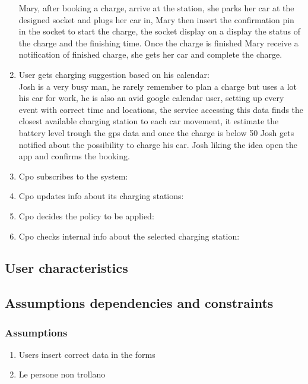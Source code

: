 \begin{enumerate}[label=S\arabic*]
          Mary, after booking a charge, arrive at the station, she parks her car at the designed socket and plugs her car in, Mary then insert the confirmation pin in the socket to start the charge, the socket display on a display the status of the charge and the finishing time.
          Once the charge is finished Mary receive a notification of finished charge, she gets her car and complete the charge.
    \item User gets charging suggestion based on his calendar:\\
          Josh is a very busy man, he rarely remember to plan a charge but uses a lot his car for work, he is also an avid google calendar user, setting up every event with correct time and locations, the service accessing this data finds the closest available charging station to each car movement, it estimate the battery level trough the gps data and once the charge is below 50 Josh gets notified about the possibility to charge his car. Josh liking the idea open the app and confirms the booking.
    \item Cpo subscribes to the system:\\
    \item Cpo updates info about its charging stations:\\
    \item Cpo decides the policy to be applied:\\
    \item Cpo checks internal info about the selected charging station:\\
\end{enumerate}
\subsection{User characteristics}

\subsection{Assumptions dependencies and constraints}
\subsubsection{Assumptions}
\begin{enumerate}[label=A\arabic*]
    \item Users insert correct data in the forms
    \item Le persone non trollano
\end{enumerate}
\clearpage